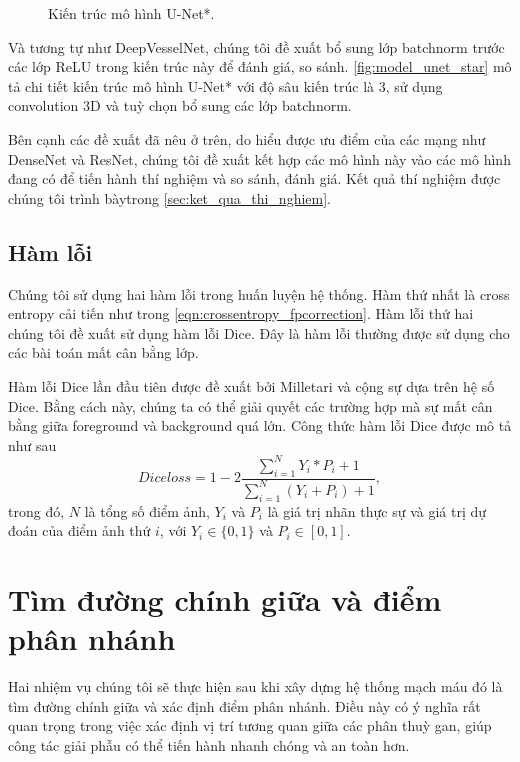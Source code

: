 	\begin{figure}[h!]
		\hspace*{-1.5mm}
		\caption{Kiến trúc mô hình U-Net*.}
		\label{fig:model_unet_star}
	\end{figure}
	Và tương tự như DeepVesselNet, chúng tôi đề xuất bổ sung lớp batchnorm trước các lớp ReLU trong kiến trúc này để đánh giá, so sánh. \autoref{fig:model_unet_star} mô tả chi tiết kiến trúc mô hình U-Net* với độ sâu kiến trúc là 3, sử dụng convolution 3D và tuỳ chọn bổ sung các lớp batchnorm.
	
	Bên cạnh các đề xuất đã nêu ở trên, do hiểu được ưu điểm của các mạng như DenseNet và ResNet, chúng tôi đề xuất kết hợp các mô hình này vào các mô hình đang có để tiến hành thí nghiệm và so sánh, đánh giá. Kết quả thí nghiệm được chúng tôi trình bày\linebreak trong \autoref{sec:ket_qua_thi_nghiem}.

\subsection{Hàm lỗi} 
\label{subsec:ham_loi}
	Chúng tôi sử dụng hai hàm lỗi trong huấn luyện hệ thống. Hàm thứ nhất là cross entropy cải tiến như trong \autoref{eqn:crossentropy_fpcorrection}. Hàm lỗi thứ hai chúng tôi đề xuất sử dụng hàm lỗi Dice. Đây là hàm lỗi thường được sử dụng cho các bài toán mất cân bằng lớp.
	
	Hàm lỗi Dice lần đầu tiên được đề xuất bởi Milletari và cộng sự \cite{milletari2016v} dựa trên hệ số Dice. Bằng cách này, chúng ta có thể giải quyết các trường hợp mà sự mất cân bằng giữa foreground và background quá lớn. Công thức hàm lỗi Dice được mô tả như sau
	\begin{equation}
		Diceloss = 1 - 2\dfrac{\sum_{i=1}^{N} Y_i * P_i + 1}{\sum_{i=1}^{N} (Y_i + P_i) + 1},
		\label{eqn:diceloss}
	\end{equation}
	trong đó, $N$ là tổng số điểm ảnh, $Y_i$ và $P_i$ là giá trị nhãn thực sự và giá trị dự đoán của điểm ảnh thứ $i$, với $Y_i \in \{0, 1\}$ và $P_i \in [0, 1]$.

\newpage
\section{Tìm đường chính giữa và điểm phân nhánh} 
\label{sec:tim_duong_chinh_giua_va_diem_phan_nhanh}
	Hai nhiệm vụ chúng tôi sẽ thực hiện sau khi xây dựng hệ thống mạch máu đó là tìm đường chính giữa và xác định điểm phân nhánh. Điều này có ý nghĩa rất quan trọng trong việc xác định vị trí tương quan giữa các phân thuỳ gan, giúp công tác giải phẫu có thể tiến hành nhanh chóng và an toàn hơn.
	
